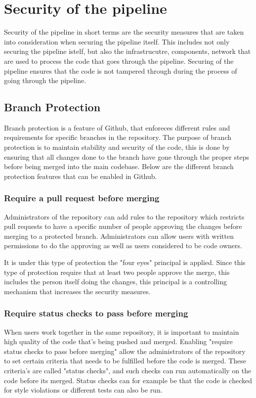 \section{Security of the pipeline}
Security of the pipeline in short terms are the security measures that are taken into consideration when securing the pipeline itself. This includes not only securing the pipeline istelf, but also the infrastrucutre, components, network that are used to process the code that goes through the pipeline. Securing of the pipeline ensures that the code is not tampered through during the process of going through the pipeline. 


\subsection{Branch Protection}
Branch protection is a feature of Github, that enforeces different rules and requirements for specific branches in the repository. The purpose of branch protection is to maintain stability and security of the code, this is done by ensuring that all changes done to the branch have gone through the proper steps before being merged into the main codebase. Below are the different branch protection features that can be enabled in Github.
\\
\subsubsection{Require a pull request before merging}
Administrators of the repository can add rules to the repository which restricts pull requests to have a specific number of people approving the changes before merging to a protected branch. Administrators can allow users with written permissions to do the approving as well as users considered to be code owners. \cite{ProtectedBranches}

It is under this type of protection the "four eyes" principal is applied. Since this type of protection require that at least two people approve the merge, this includes the person itself doing the changes, this principal is a controlling mechanism that increases the security measures. 
\\
\subsubsection{Require status checks to pass before merging}
When users work together in the same repository, it is important to maintain high quality of the code that's being pushed and merged. Enabling "require status checks to pass before merging" allow the administrators of the repository to set certain criteria that needs to be fulfilled before the code is merged. These criteria's are called "status checks", and such checks can run automatically on the code before its merged. Status checks can for example be that the code is checked for style violations or different tests can also be run. \cite{ProtectedBranches}
\newpage
